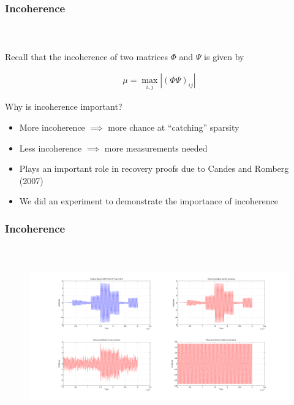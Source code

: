 
\begin{frame}[t]
\frametitle{Incoherence}
\framesubtitle{~~}  %

Recall that the incoherence of two matrices $\Phi$ and $\Psi$ is given by 

\begin{align}
	\mu = \max_{i,j} |(\Phi \Psi)_{ij}|
	\label{incoherence}
\end{align}

Why is incoherence important?

\begin{itemize}
	\item More incoherence $\implies$ more chance at ``catching'' sparsity
	\item Less incoherence $\implies$ more measurements needed
	\item Plays an important role in recovery proofs due to Candes and Romberg (2007)
	\item We did an experiment to demonstrate the importance of incoherence
\end{itemize}
\end{frame}

\begin{frame}[t]
\frametitle{Incoherence}
\framesubtitle{~~}  %

\begin{figure}[h!]
  \centering
    \includegraphics[width=1\textwidth]{figs/incoherence.pdf}
\end{figure}


\end{frame}

